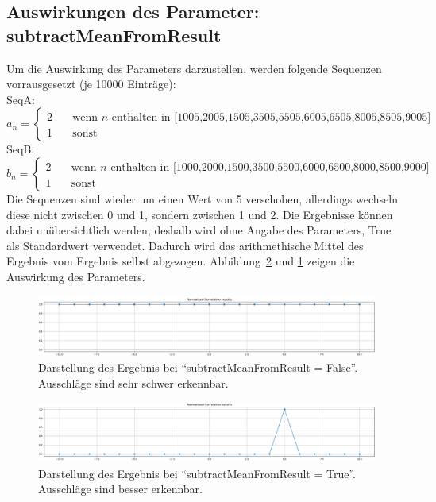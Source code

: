 \subsection{Auswirkungen des Parameter: subtractMeanFromResult}
Um die Auswirkung des Parameters darzustellen, werden folgende Sequenzen vorrausgesetzt (je 10000 Einträge):\\
SeqA:
\[ a_{n} =
  \begin{cases}
    2       & \quad \text{wenn } n \text{ enthalten in [1005,2005,1505,3505,5505,6005,6505,8005,8505,9005]}\\
    1  & \quad \text{sonst}
  \end{cases}
\]
SeqB:
\[ b_{n} =
  \begin{cases}
    2       & \quad \text{wenn } n \text{ enthalten in [1000,2000,1500,3500,5500,6000,6500,8000,8500,9000]}\\
    1  & \quad \text{sonst}
  \end{cases}
\]
Die Sequenzen sind wieder um einen Wert von 5 verschoben, allerdings wechseln diese nicht zwischen 0 und 1, sondern zwischen 1 und 2. 
Die Ergebnisse können dabei unübersichtlich werden, deshalb wird ohne Angabe des Parameters, True als Standardwert verwendet.
Dadurch wird das arithmethische Mittel des Ergebnis vom Ergebnis selbst abgezogen. Abbildung~\ref{fig:correlationSubtractMeamFromResultTrue} 
und \ref{fig:correlationSubtractMeamFromResultFalse} zeigen die Auswirkung des Parameters. 
\begin{figure}[H]
    \includegraphics[width=\linewidth]{pythonImplementation/images/correlationSubtractMeamFromResultFalse.PNG}
    \caption[Ergebnis: subtractMeanFromResult = False]{Darstellung des Ergebnis bei \enquote{subtractMeanFromResult = False}. Ausschläge sind sehr schwer erkennbar\footnotemark. }
    \label{fig:correlationSubtractMeamFromResultFalse}
\end{figure}

\begin{figure}[H]
    \includegraphics[width=\linewidth]{pythonImplementation/images/correlationSubtractMeamFromResultTrue.PNG}
    \caption[Ergebnis: subtractMeanFromResult = True]{Darstellung des Ergebnis bei \enquote{subtractMeanFromResult = True}. Ausschläge sind besser erkennbar\footnotemark. }
    \label{fig:correlationSubtractMeamFromResultTrue}
\end{figure}


